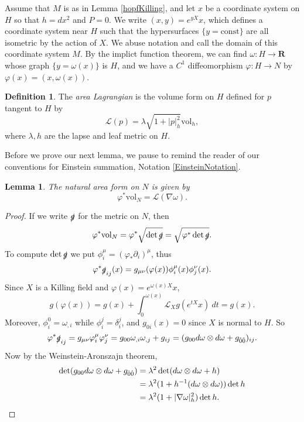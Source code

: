 \documentclass[reqno,12pt,letterpaper]{amsart}
\newcommand{\RR}{\mathbf{R}}
\newcommand{\Lagrange}{\mathscr L}
\newcommand{\vol}{\mathrm{vol}}
\newcommand{\dfn}[1]{\emph{#1}\index{#1}}
\newtheorem{lemma}[theorem]{Lemma}
\theoremstyle{definition}
\newtheorem{definition}[theorem]{Definition}
\numberwithin{equation}{section}
\begin{document}
Assume that $M$ is as in Lemma \ref{hopfKilling}, and let $x$ be a coordinate system on $H$ so that $h = dx^2$ and $P = 0$.
We write $(x, y) = e^{yX}x$, which defines a coordinate system near $H$ such that the hypersurfaces $\{y = \text{const}\}$ are all isometric by the action of $X$.
We abuse notation and call the domain of this coordinate system $M$.
By the implict function theorem, we can find $\omega: H \to \RR$ whose graph $\{y = \omega(x)\}$ is $H$, and we have a $C^1$ diffeomorphism $\varphi: H \to N$ by $\varphi(x) = (x, \omega(x))$.

\begin{definition}
The \dfn{area Lagrangian} is the volume form on $H$ defined for $p$ tangent to $H$ by
$$\Lagrange(p) = \lambda \sqrt{1 + |p|_h^2} \vol_h,$$
where $\lambda,h$ are the lapse and leaf metric on $H$.
\end{definition}

Before we prove our next lemma, we pause to remind the reader of our conventions for Einstein summation, Notation \ref{EinsteinNotation}.

\begin{lemma}
The natural area form on $N$ is given by
$$\varphi^* \vol_N = \Lagrange(\nabla \omega).$$
\end{lemma}
\begin{proof}
If we write $\slashed g$ for the metric on $N$, then
$$\varphi^* \vol_N = \varphi^* \sqrt{\det \slashed g} = \sqrt{\varphi^* \det \slashed g}.$$
To compute $\det \slashed g$ we put $\phi_i^\mu = (\varphi_* \partial_i)^\mu$, thus
$$\varphi^* \slashed g_{ij}(x) = g_{\mu\nu}(\varphi(x))\phi^\mu_i(x) \phi^\nu_j(x).$$
Since $X$ is a Killing field and $\varphi(x) = e^{\omega(x)X}x$,
$$g(\varphi(x)) = g(x) + \int_0^{\omega(x)} \mathcal L_X g(e^{tX}x) ~dt = g(x).$$
Moreover, $\phi_i^0 = \omega_{,i}$ while $\phi_i^j = \delta_i^j$, and $g_{0i}(x) = 0$ since $X$ is normal to $H$.
So
$$\varphi^* \slashed g_{ij} = g_{\mu\nu} \varphi_i^\mu \varphi_j^\nu = g_{00} \omega_{,i} \omega_{,j} + g_{ij} = (g_{00}d\omega \otimes d\omega + g_{\hat 0 \hat 0})_{ij}.$$
Now by the Weinstein-Aronszajn theorem,
\begin{align*}
\det(g_{00}d\omega \otimes d\omega + g_{\hat 0 \hat 0})
&= \lambda^2 \det(d\omega \otimes d\omega + h)\\
&= \lambda^2 (1 + h^{-1}(d \omega \otimes d\omega)) \det h \\
&= \lambda^2 (1 + |\nabla \omega|_h^2) \det h. \qedhere
\end{align*}
\end{proof}
\end{document}
